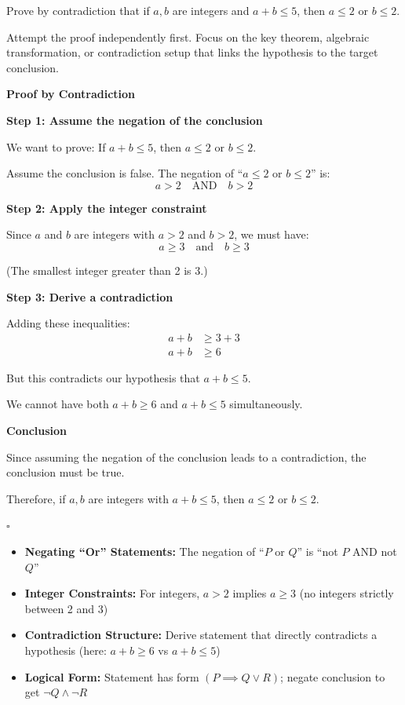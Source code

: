 
\begin{problem}[Contradiction with a + b <= 5]
Prove by contradiction that if $a, b$ are integers and $a + b \leq 5$, then $a \leq 2$ or $b \leq 2$.
\end{problem}

\begin{hint}
Attempt the proof independently first. Focus on the key theorem, algebraic transformation, or contradiction setup that links the hypothesis to the target conclusion.
\end{hint}

\begin{solution}
\textbf{Proof by Contradiction}

\textbf{Step 1: Assume the negation of the conclusion}

We want to prove: If $a + b \leq 5$, then $a \leq 2$ or $b \leq 2$.

Assume the conclusion is false. The negation of ``$a \leq 2$ or $b \leq 2$'' is:
\[ a > 2 \quad \text{AND} \quad b > 2 \]

\textbf{Step 2: Apply the integer constraint}

Since $a$ and $b$ are integers with $a > 2$ and $b > 2$, we must have:
\[ a \geq 3 \quad \text{and} \quad b \geq 3 \]

(The smallest integer greater than 2 is 3.)

\textbf{Step 3: Derive a contradiction}

Adding these inequalities:
\begin{align*}
    a + b &\geq 3 + 3 \\
    a + b &\geq 6
\end{align*}

But this contradicts our hypothesis that $a + b \leq 5$.

We cannot have both $a + b \geq 6$ and $a + b \leq 5$ simultaneously.

\textbf{Conclusion}

Since assuming the negation of the conclusion leads to a contradiction, the conclusion must be true.

Therefore, if $a, b$ are integers with $a + b \leq 5$, then $a \leq 2$ or $b \leq 2$.

\hfill $\square$
\end{solution}

\begin{takeaways}
\begin{itemize}
\item \textbf{Negating ``Or'' Statements:} The negation of ``$P$ or $Q$'' is ``not $P$ AND not $Q$''
\item \textbf{Integer Constraints:} For integers, $a > 2$ implies $a \geq 3$ (no integers strictly between 2 and 3)
\item \textbf{Contradiction Structure:} Derive statement that directly contradicts a hypothesis (here: $a+b \geq 6$ vs $a+b \leq 5$)
\item \textbf{Logical Form:} Statement has form $(P \implies Q \lor R)$; negate conclusion to get $\neg Q \land \neg R$
\end{itemize}
\end{takeaways}
